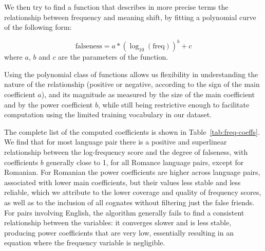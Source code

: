 \documentclass[output=paper]{langsci/langscibook}
\begin{document}
We then try to find a function that describes in more precise terms the relationship between frequency and meaning shift, by fitting a polynomial curve of the following form:

\begin{equation}
    \text{falseness} = a * (\log_{10}(\text{freq}))^b + c
\end{equation}
where $a$, $b$ and $c$ are the parameters of the function. 

Using the polynomial class of functions allows us flexibility in understanding the nature of the relationship (positive or negative, according to the sign of the main coefficient $a$), and its magnitude as measured by the size of the main coefficient and by the power coefficient $b$, while still being restrictive enough to facilitate computation using the limited training vocabulary in our dataset.

The complete list of the computed coefficients is shown in Table~\ref{tab:freq-coeffs}. We find that for most language pair there is a positive and superlinear relationship between the log-frequency score and the degree of falseness, with coefficients $b$ generally close to 1, for all Romance language pairs, except for Romanian. For Romanian the power coefficients are higher across language pairs, associated with lower main coefficients, but their values less stable and less reliable, which we attribute to the lower coverage and quality of frequency scores, as well as to the inclusion of all cognates without filtering just the false friends. For pairs involving English, the algorithm generally fails to find a consistent relationship between the variables: it converges slower and is less stable, producing power coefficients that are very low, essentially resulting in an equation where the frequency variable is negligible.
\end{document}
